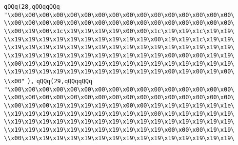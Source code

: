 \verb|qQQq(28,qQQqqQQq|\newline
\verb|"\x00\x00\x00\x00\x00\x00\x00\x00\x00\x00\x00\x00\x00\x00\x00\x00\|\newline
\verb|\\x00\x00\x00\x00\x00\x00\x00\x00\x00\x00\x00\x00\x00\x00\x00\x00\|\newline
\verb|\\x00\x19\x00\x1c\x19\x19\x19\x19\x00\x00\x1c\x19\x19\x1c\x19\x19\|\newline
\verb|\\x19\x19\x19\x19\x19\x19\x19\x19\x19\x19\x00\x19\x19\x1c\x19\x19\|\newline
\verb|\\x19\x19\x19\x19\x19\x19\x19\x19\x19\x19\x19\x19\x19\x19\x19\x19\|\newline
\verb|\\x19\x19\x19\x19\x19\x19\x19\x19\x19\x19\x19\x00\x00\x00\x19\x19\|\newline
\verb|\\x00\x19\x19\x19\x19\x19\x19\x19\x19\x19\x19\x19\x19\x19\x19\x19\|\newline
\verb|\\x19\x19\x19\x19\x19\x19\x19\x19\x19\x19\x19\x00\x19\x00\x19\x00\|\newline
\verb|\\x00"|\newline
\verb|),|\newline
\verb|qQQq(29,qQQqqQQq|\newline
\verb|"\x00\x00\x00\x00\x00\x00\x00\x00\x00\x00\x00\x00\x00\x00\x00\x00\|\newline
\verb|\\x00\x00\x00\x00\x00\x00\x00\x00\x00\x00\x00\x00\x00\x00\x00\x00\|\newline
\verb|\\x00\x19\x00\x19\x19\x19\x19\x19\x00\x00\x19\x19\x19\x19\x19\x1e\|\newline
\verb|\\x19\x19\x19\x19\x19\x19\x19\x19\x19\x19\x00\x19\x19\x19\x19\x19\|\newline
\verb|\\x19\x19\x19\x19\x19\x19\x19\x19\x19\x19\x19\x19\x19\x19\x19\x19\|\newline
\verb|\\x19\x19\x19\x19\x19\x19\x19\x19\x19\x19\x19\x00\x00\x00\x19\x19\|\newline
\verb|\\x00\x19\x19\x19\x19\x19\x19\x19\x19\x19\x19\x19\x19\x19\x19\x19\|\newline

